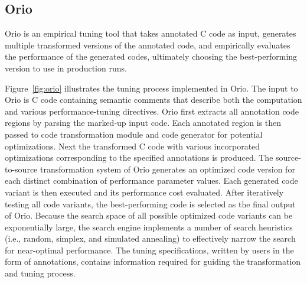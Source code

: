 \documentclass[runningheads]{llncs}
\begin{document}





\subsection{Orio}
\label{sec:orio}

Orio\cite{Norris:2007,Hartono:IPDPS09} is an empirical tuning tool that takes
annotated C code as input, generates multiple transformed versions of the
annotated code, and empirically evaluates the performance of the generated
codes, ultimately choosing the best-performing version to use in production
runs.

Figure~\ref{fig:orio} illustrates the tuning process implemented in
Orio. The input to Orio is C code containing semantic comments that
describe both the computation and various performance-tuning
directives. Orio first extracts all annotation code regions by parsing
the marked-up input code. Each annotated region is then passed to code
transformation module and code generator for potential optimizations. Next the
transformed C code with various incorporated optimizations
corresponding to the specified annotations is produced. The
source-to-source transformation system of Orio generates an optimized
code version for each distinct combination of performance parameter
values. Each generated code variant is then executed and its
performance cost evaluated. After iteratively testing all code
variants, the best-performing code is selected as the final output of
Orio. Because the search space of all possible optimized code variants
can be exponentially large, the search engine implements a number of
search heuristics (i.e., random, simplex, and simulated annealing) to
effectively narrow the search for near-optimal performance. The tuning
specifications, written by users in the form of annotations, contains
information required for guiding the transformation and tuning
process.
\end{document}
